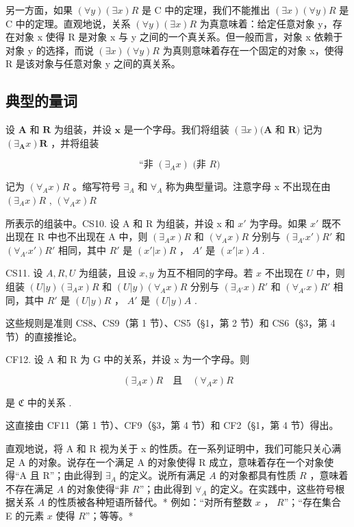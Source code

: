 另一方面，如果 \((\forall y)(\exists x)R\) 是 C 中的定理，我们不能推出 \((\exists x)(\forall y)R\) 是 C 中的定理。直观地说，关系 \((\forall y)(\exists x)R\) 为真意味着：给定任意对象 y，存在对象 x 使得 R 是对象 x 与 y 之间的一个真关系。但一般而言，对象 x 依赖于对象 y 的选择，而说 \((\exists x)(\forall y)R\) 为真则意味着存在一个固定的对象 x，使得 R 是该对象与任意对象 y 之间的真关系。

\subsection{典型的量词}

设 \(\pmb{A}\) 和 \(\pmb{R}\) 为组装，并设 \(\pmb{x}\) 是一个字母。我们将组装 \((\exists x)(\pmb{A}\) 和 \(\pmb{R})\) 记为 \((\exists_{\pmb{A}}x)\pmb{R}\) ，并将组装

\[
\text {   ``非   } (\exists_ {A} x) \text {   (非   } R)
\]

记为 \((\forall_{A}x)R\) 。缩写符号 \(\exists_{A}\) 和 \(\forall_{A}\) 称为典型量词。注意字母 x 不出现在由 \((\exists_{A}x)R\) , \((\forall_{A}x)R\)

所表示的组装中。CS10. 设 A 和 R 为组装，并设 x 和 \(x'\) 为字母。如果 \(x'\) 既不出现在 R 中也不出现在 A 中，则 \((\exists_{A}x)R\) 和 \((\forall_{A}x)R\) 分别与 \((\exists_{A'}x')R'\) 和 \((\forall_{A'}x')R'\) 相同，其中 \(R'\) 是 \((x'|x)R\) ， \(A'\) 是 \((x'|x)A\) .

CS11. 设 \(A, R, U\) 为组装，且设 \(x, y\) 为互不相同的字母。若 \(x\) 不出现在 \(U\) 中，则组装 \((U|y)(\exists_A x)R\) 和 \((U|y)(\forall_A x)R\) 分别与 \((\exists_{A'}x)R'\) 和 \((\forall_{A'}x)R'\) 相同，其中 \(R'\) 是 \((U|y)R\) ， \(A'\) 是 \((U|y)A\) .

这些规则是准则 CS8、CS9（第 1 节）、CS5（§1，第 2 节）和 CS6（§3，第 4 节）的直接推论。

CF12. 设 A 和 R 为 G 中的关系，并设 x 为一个字母。则

\[
(\exists_ {A} x) R \quad \text{且} \quad (\forall_ {A} x) R
\]

是 \(\mathfrak{C}\) 中的关系 .

这直接由 CF11（第 1 节）、CF9（§3，第 4 节）和 CF2（§1，第 4 节）得出。

直观地说，将 A 和 R 视为关于 x 的性质。在一系列证明中，我们可能只关心满足 A 的对象。说存在一个满足 A 的对象使得 R 成立，意味着存在一个对象使得“A 且 R”；由此得到 \(\exists_{A}\) 的定义。说所有满足 \(A\) 的对象都具有性质 \(R\) ，意味着不存在满足 \(A\) 的对象使得“非 \(R\)”；由此得到 \(\forall_{A}\) 的定义。在实践中，这些符号根据关系 \(A\) 的性质被各种短语所替代。* 例如：“对所有整数 \(x\) ， \(R\)”；“存在集合 E 的元素 \(x\) 使得 \(R\)”；等等。*

